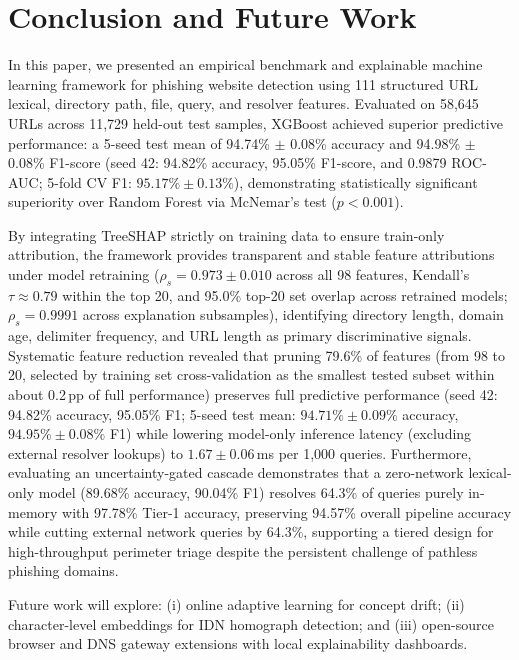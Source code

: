 \section{Conclusion and Future Work}
\label{sec:conclusion}

In this paper, we presented an empirical benchmark and explainable machine learning framework for phishing website detection using 111 structured URL lexical, directory path, file, query, and resolver features. Evaluated on 58,645 URLs across 11,729 held-out test samples, XGBoost achieved superior predictive performance: a 5-seed test mean of 94.74\% $\pm$ 0.08\% accuracy and 94.98\% $\pm$ 0.08\% F1-score (seed 42: 94.82\% accuracy, 95.05\% F1-score, and 0.9879 ROC-AUC; 5-fold CV F1: $95.17\% \pm 0.13\%$), demonstrating statistically significant superiority over Random Forest via McNemar's test ($p < 0.001$).

By integrating TreeSHAP strictly on training data to ensure train-only attribution, the framework provides transparent and stable feature attributions under model retraining ($\rho_s = 0.973 \pm 0.010$ across all 98 features, Kendall's $\tau \approx 0.79$ within the top 20, and 95.0\% top-20 set overlap across retrained models; $\rho_s = 0.9991$ across explanation subsamples), identifying directory length, domain age, delimiter frequency, and URL length as primary discriminative signals. Systematic feature reduction revealed that pruning 79.6\% of features (from 98 to 20, selected by training set cross-validation as the smallest tested subset within about 0.2\,pp of full performance) preserves full predictive performance (seed 42: 94.82\% accuracy, 95.05\% F1; 5-seed test mean: $94.71\% \pm 0.09\%$ accuracy, $94.95\% \pm 0.08\%$ F1) while lowering model-only inference latency (excluding external resolver lookups) to $1.67 \pm 0.06$\,ms per 1,000 queries. Furthermore, evaluating an uncertainty-gated cascade demonstrates that a zero-network lexical-only model (89.68\% accuracy, 90.04\% F1) resolves 64.3\% of queries purely in-memory with 97.78\% Tier-1 accuracy, preserving 94.57\% overall pipeline accuracy while cutting external network queries by 64.3\%, supporting a tiered design for high-throughput perimeter triage despite the persistent challenge of pathless phishing domains.

Future work will explore: (i) online adaptive learning for concept drift; (ii) character-level embeddings for IDN homograph detection; and (iii) open-source browser and DNS gateway extensions with local explainability dashboards.

